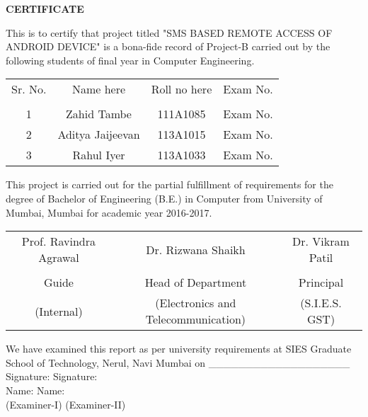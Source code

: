 

\newpage
\thispagestyle{empty}

\begin{center}
\large {\textbf{CERTIFICATE}}\\[0.5cm]
\end{center}

\normalsize This is to certify that project titled "SMS BASED REMOTE ACCESS OF ANDROID DEVICE" is a bona-fide record of Project-B carried out by the following students of final year in Computer Engineering.\\[1.0cm]

\begin{table}[h]
\centering
\begin{tabular}{c c c c}
Sr. No. & Name here &  Roll no here & Exam No.\\
\\
1 & Zahid Tambe &  111A1085 & Exam No. \\ 
2 & Aditya Jaijeevan &  113A1015 & Exam No.\\
3 & Rahul Iyer &  113A1033 & Exam No. \\
\end{tabular}
\end{table}

\vspace{2cm}

This project is carried out for the partial fulfillment of requirements for the degree of Bachelor of Engineering (B.E.) in Computer from University of Mumbai, Mumbai for academic year 2016-2017.
\vspace{2cm}
\begin{table}[h]
	\centering
	\begin{tabular}{c c c}
		Prof. Ravindra Agrawal & Dr. Rizwana Shaikh &  Dr. Vikram Patil \\
		\\
		Guide & Head of Department & Principal \\ 
		\small (Internal) & \small (Electronics and Telecommunication) &  \small (S.I.E.S. GST)\\
		\hline
	\end{tabular}
\end{table}

We have examined this report as per university requirements at SIES Graduate School of Technology, Nerul, Navi Mumbai on 
\_\_\_\_\_\_\_\_\_\_\_\_\_\_\_\_\_\_\_\\


Signature: \hspace{5.7cm} Signature:  \\

Name:\hspace{6.5cm}  Name: \\

(Examiner-I)  \hspace{5cm}  (Examiner-II) \\

